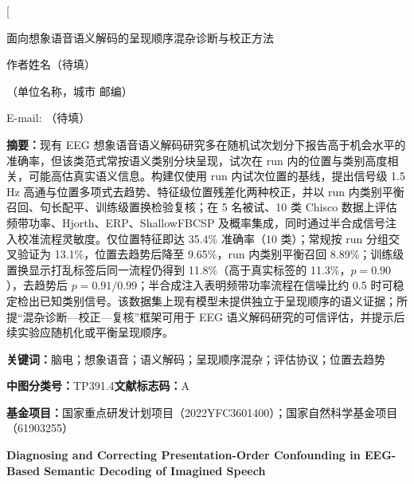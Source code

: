 \documentclass[twocolumn,10pt]{ctexart}
\begin{document}
\twocolumn[{
\begin{center}
{\heiti{} 面向想象语音语义解码的呈现顺序混杂诊断与校正方法\par}
\vspace{0.6em}
{ 作者姓名（待填）\par}
\vspace{0.3em}
{（单位名称，城市 邮编）\par}
{ E-mail: （待填）\par}
\end{center}
\vspace{0.3em}
\begin{center}
\begin{minipage}{0.94\textwidth}
\noindent\textbf{摘\quad 要：}现有 EEG 想象语音语义解码研究多在随机试次划分下报告高于机会水平的准确率，但该类范式常按语义类别分块呈现，试次在 run 内的位置与类别高度相关，可能高估真实语义信息。构建仅使用 run 内试次位置的基线，提出信号级 1.5 Hz 高通与位置多项式去趋势、特征级位置残差化两种校正，并以 run 内类别平衡召回、句长配平、训练级置换检验复核；在 5 名被试、10 类 Chisco 数据上评估频带功率、Hjorth、ERP、ShallowFBCSP 及概率集成，同时通过半合成信号注入校准流程灵敏度。仅位置特征即达 35.4\% 准确率（10 类）；常规按 run 分组交叉验证为 13.1\%，位置去趋势后降至 9.65\%，run 内类别平衡召回 8.89\%；训练级置换显示打乱标签后同一流程仍得到 11.8\%（高于真实标签的 11.3\%，$p=0.90$），去趋势后 $p=0.91/0.99$；半合成注入表明频带功率流程在信噪比约 0.5 时可稳定检出已知类别信号。该数据集上现有模型未提供独立于呈现顺序的语义证据；所提“混杂诊断—校正—复核”框架可用于 EEG 语义解码研究的可信评估，并提示后续实验应随机化或平衡呈现顺序。

\noindent\textbf{关键词：}脑电；想象语音；语义解码；呈现顺序混杂；评估协议；位置去趋势

\noindent\textbf{中图分类号：}TP391.4\quad\textbf{文献标志码：}A

\noindent\textbf{基金项目：}国家重点研发计划项目（2022YFC3601400）；国家自然科学基金项目（61903255）

\vspace{0.6em}
\noindent\textbf{Diagnosing and Correcting Presentation-Order Confounding in EEG-Based Semantic Decoding of Imagined Speech}


\end{minipage}
\end{center}}
\end{document}
